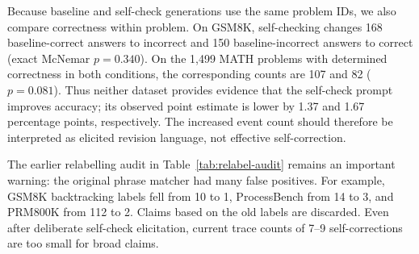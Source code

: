 \documentclass[manuscript,screen,review]{jair}
\newcommand{\modelmetrics}[2]{\textit{Model(s):} #1. \textit{Metrics:} #2.}
\begin{document}
\begin{table}[t]
\centering
\caption{High-precision trace taxonomy. Percentages are of all traces. SC
denotes self-correction; the PRM800K row is a corrected legacy output rather
than part of the current five-condition run.  \modelmetrics{
\texttt{allenai/OLMoE-1B-7B-0924-Instruct}; PRM800K uses a separately retained
legacy run of the same model}{trace count, final-answer/stored-outcome
accuracy, and trace-level counts and percentages for backtracking,
contradiction, self-correction, and final-answer reversal}}
\label{tab:taxonomy-current}
\end{table}

Because baseline and self-check generations use the same problem IDs, we also
compare correctness within problem.  On GSM8K, self-checking changes 168
baseline-correct answers to incorrect and 150 baseline-incorrect answers to
correct (exact McNemar $p=0.340$).  On the 1,499 MATH problems with determined
correctness in both conditions, the corresponding counts are 107 and 82
($p=0.081$).  Thus neither dataset provides evidence that the self-check
prompt improves accuracy; its observed point estimate is lower by 1.37 and
1.67 percentage points, respectively.  The increased event count should
therefore be interpreted as elicited revision language, not effective
self-correction.

The earlier relabelling audit in Table~\ref{tab:relabel-audit} remains an
important warning: the original phrase matcher had many false positives.  For
example, GSM8K backtracking labels fell from 10 to 1, ProcessBench from 14 to
3, and PRM800K from 112 to 2.  Claims based on the old labels are discarded.
Even after deliberate self-check elicitation, current trace counts of 7--9
self-corrections are too small for broad claims.
\end{document}

